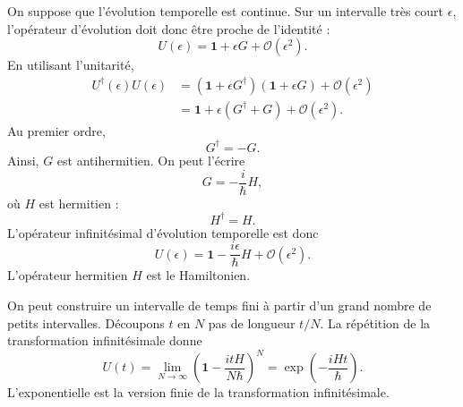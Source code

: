 On suppose que l’évolution temporelle est continue. Sur un intervalle très court \(\epsilon\), l’opérateur d’évolution doit donc être proche de l’identité :
\begin{equation}
U(\epsilon)=\mathbf 1+\epsilon G+\mathcal O(\epsilon^2).
\end{equation}
En utilisant l’unitarité,
\begin{align}
U^\dagger(\epsilon)U(\epsilon)
&=
\left(\mathbf 1+\epsilon G^\dagger\right)
\left(\mathbf 1+\epsilon G\right)
+\mathcal O(\epsilon^2)
\\
&=
\mathbf 1+\epsilon(G^\dagger+G)
+\mathcal O(\epsilon^2).
\end{align}
Au premier ordre,
\begin{equation}
G^\dagger=-G.
\end{equation}
Ainsi, \(G\) est antihermitien. On peut l’écrire
\begin{equation}
G=-\frac{i}{\hbar}H,
\end{equation}
où \(H\) est hermitien :
\begin{equation}
H^\dagger=H.
\end{equation}
L’opérateur infinitésimal d’évolution temporelle est donc
\begin{equation}
U(\epsilon)
=
\mathbf 1-\frac{i\epsilon}{\hbar}H
+\mathcal O(\epsilon^2).
\end{equation}
L’opérateur hermitien \(H\) est le Hamiltonien.

\begin{classroomqa}
\end{classroomqa}

On peut construire un intervalle de temps fini à partir d’un grand nombre de petits intervalles. Découpons \(t\) en \(N\) pas de longueur \(t/N\). La répétition de la transformation infinitésimale donne
\begin{equation}
U(t)
=
\lim_{N\to\infty}
\left(
\mathbf 1-\frac{itH}{N\hbar}
\right)^N
=
\exp\left(-\frac{iHt}{\hbar}\right).
\end{equation}
L’exponentielle est la version finie de la transformation infinitésimale.

